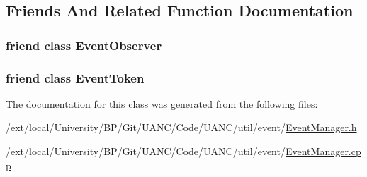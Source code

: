 \subsection{Friends And Related Function Documentation}
\subsubsection[{\texorpdfstring{Event\+Observer}{EventObserver}}]{\setlength{\rightskip}{0pt plus 5cm}friend class {\bf Event\+Observer}\hspace{0.3cm}{\ttfamily [friend]}}\hypertarget{classuanc_1_1util_1_1event_1_1_event_manager_a7512992e19dc2f4613dea5e056e626f9}{}\label{classuanc_1_1util_1_1event_1_1_event_manager_a7512992e19dc2f4613dea5e056e626f9}
\subsubsection[{\texorpdfstring{Event\+Token}{EventToken}}]{\setlength{\rightskip}{0pt plus 5cm}friend class {\bf Event\+Token}\hspace{0.3cm}{\ttfamily [friend]}}\hypertarget{classuanc_1_1util_1_1event_1_1_event_manager_ac94178afc9fbbac2a5735d761b6b2ae5}{}\label{classuanc_1_1util_1_1event_1_1_event_manager_ac94178afc9fbbac2a5735d761b6b2ae5}


The documentation for this class was generated from the following files\+:\begin{DoxyCompactItemize}
\item 
/ext/local/\+University/\+B\+P/\+Git/\+U\+A\+N\+C/\+Code/\+U\+A\+N\+C/util/event/\hyperlink{_event_manager_8h}{Event\+Manager.\+h}\item 
/ext/local/\+University/\+B\+P/\+Git/\+U\+A\+N\+C/\+Code/\+U\+A\+N\+C/util/event/\hyperlink{_event_manager_8cpp}{Event\+Manager.\+cpp}\end{DoxyCompactItemize}
